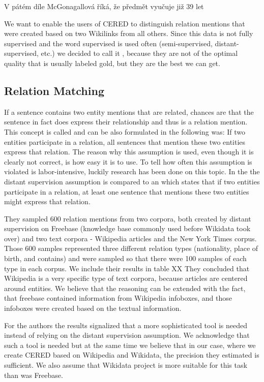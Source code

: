 V pátém díle McGonagallová říká, že předmět vyučuje již 39 let

We want to enable the users of CERED to distinguish relation mentions that were created based on two Wikilinks from all others. Since this data is not fully supervised and the word supervised is used often  (semi-supervised, distant-supervised, etc.) we decided to call it , because they are not of the optimal quality that is usually labeled gold, but they are the best we can get.


\subsection{Relation Matching}
If a sentence contains two entity mentions that are related, chances are that the sentence in fact does express their relationship and thus is a relation mention. This concept is called  and can be also formulated in the following was: If two entities participate in a relation, all sentences that  mention these two entities express that relation. The reason why this assumption is used, even though it is clearly not correct, is how easy it is to use. To tell how often this assumption is violated is labor-intensive, luckily research has been done on this topic. In the \cite{nytdistant}  the distant supervision assumption is compared to an  which states that if two entities participate in a relation, at least one sentence that mentions these two entities might express that relation. 

They sampled 600 relation mentions from two corpora, both created by distant supervision on Freebase (knowledge base commonly used before Wikidata took over) and two text corpora - Wikipedia articles and the New York Times corpus. Those 600 samples represented three different relation types (nationality, place of birth, and contains) and were sampled so that there were 100 samples of each type in each corpus. We include their results in table XX  They concluded that Wikipedia is a very specific type of text corpora, because articles are centered around entities. We believe that the reasoning can be extended with the fact, that freebase contained information from Wikipedia infoboxes, and those infoboxes were created based on the textual information. 

For the authors the results signalized that a more sophisticated tool is needed instead of relying on the distant supervision assumption. We acknowledge that such a tool is needed but at the same time we believe that in our case, where we create CERED based on Wikipedia and Wikidata, the precision they estimated is sufficient. We also assume that Wikidata project is more suitable for this task than was Freebase.

